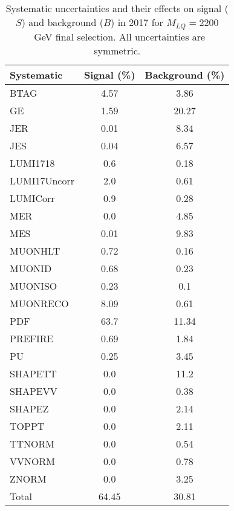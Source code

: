 \begin{table}[htbp]
\begin{center}
\caption{Systematic uncertainties and their effects on signal ($S$) and background ($B$) in 2017 for $M_{LQ}=2200$~GeV final selection. All uncertainties are symmetric.}
\begin{tabular}{lcc}
\hline\hline
Systematic & Signal (\%) & Background (\%) \\ \hline 
BTAG & 4.57 & 3.86\\ 
GE & 1.59 & 20.27\\ 
JER & 0.01 & 8.34\\ 
JES & 0.04 & 6.57\\ 
LUMI1718 & 0.6 & 0.18\\ 
LUMI17Uncorr & 2.0 & 0.61\\ 
LUMICorr & 0.9 & 0.28\\ 
MER & 0.0 & 4.85\\ 
MES & 0.01 & 9.83\\ 
MUONHLT & 0.72 & 0.16\\ 
MUONID & 0.68 & 0.23\\ 
MUONISO & 0.23 & 0.1\\ 
MUONRECO & 8.09 & 0.61\\ 
PDF & 63.7 & 11.34\\ 
PREFIRE & 0.69 & 1.84\\ 
PU & 0.25 & 3.45\\ 
SHAPETT & 0.0 & 11.2\\ 
SHAPEVV & 0.0 & 0.38\\ 
SHAPEZ & 0.0 & 2.14\\ 
TOPPT & 0.0 & 2.11\\ 
TTNORM & 0.0 & 0.54\\ 
VVNORM & 0.0 & 0.78\\ 
ZNORM & 0.0 & 3.25\\ 
Total & 64.45 & 30.81\\ \hline \hline
\end{tabular}
\label{tab:SysUncertainties_uujj_2200}
\end{center}
\end{table}

